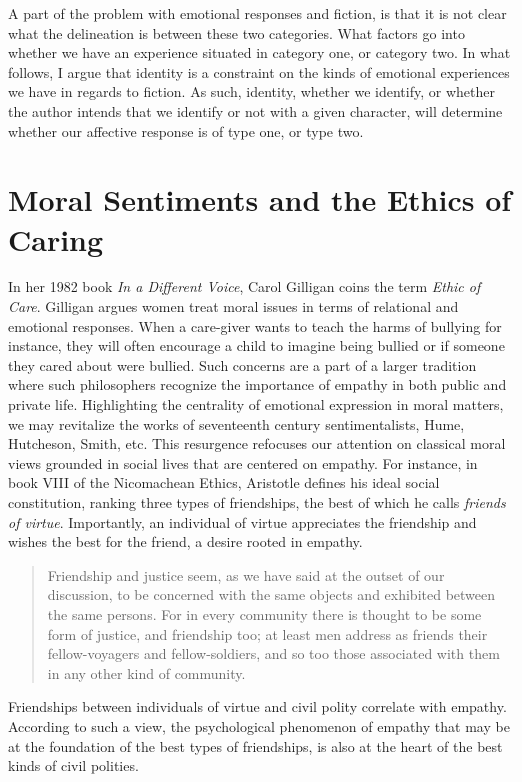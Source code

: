 \documentclass[phdthesis,12pt,final]{wuthesis}
\theoremstyle{definition}
\theoremstyle{definition}
\theoremstyle{definition}
\theoremstyle{definition}
\theoremstyle{remark}
\begin{document}
A part of the problem with emotional responses and fiction, is that it is not clear what the delineation is between these two categories. What factors go into whether we have an experience situated in category one, or category two. In what follows, I argue that identity is a constraint on the kinds of emotional experiences we have in regards to fiction. As such, identity, whether we identify, or whether the author intends that we identify or not with a given character, will determine whether our affective response is of type one, or type two.

\section{Moral Sentiments and the Ethics of Caring}\label{moral-sentiments-and-the-ethics-of-caring}

In her 1982 book \emph{In a Different Voice}, Carol Gilligan coins the term \emph{Ethic of Care}. Gilligan argues women treat moral issues in terms of relational and emotional responses. When a care-giver wants to teach the harms of bullying for instance, they will often encourage a child to imagine being bullied or if someone they cared about were bullied. Such concerns are a part of a larger tradition where such philosophers recognize the importance of empathy in both public and private life. Highlighting the centrality of emotional expression in moral matters, we may revitalize the works of seventeenth century sentimentalists, Hume, Hutcheson, Smith, etc. This resurgence refocuses our attention on classical moral views grounded in social lives that are centered on empathy. For instance, in book VIII of the Nicomachean Ethics, Aristotle defines his ideal social constitution, ranking three types of friendships, the best of which he calls \emph{friends of virtue}. Importantly, an individual of virtue appreciates the friendship and wishes the best for the friend, a desire rooted in empathy.

\begin{quote}
Friendship and justice seem, as we have said at the outset of our discussion, to be concerned with the same objects and exhibited between the same persons. For in every community there is thought to be some form of justice, and friendship too; at least men address as friends their fellow-voyagers and fellow-soldiers, and so too those associated with them in any other kind of community.
\end{quote}

Friendships between individuals of virtue and civil polity correlate with empathy. According to such a view, the psychological phenomenon of empathy that may be at the foundation of the best types of friendships, is also at the heart of the best kinds of civil polities.
\end{document}
